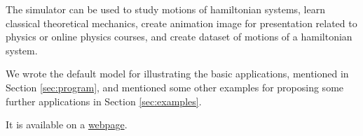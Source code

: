 \documentclass[12pt]{article}
\begin{document}
The simulator can be used to study motions of hamiltonian systems,
learn classical theoretical mechanics,
create animation image for presentation related to physics or online physics courses,
and create dataset of motions of a hamiltonian system.

We wrote the default model for illustrating the basic applications, mentioned in Section \ref{sec:program},
and mentioned some other examples for proposing some further applications in Section \ref{sec:examples}.

It is available on a
\href{https://UlyssesZh.github.io/rpg/mechsimul2}{webpage}.

\newpage

\end{document}
